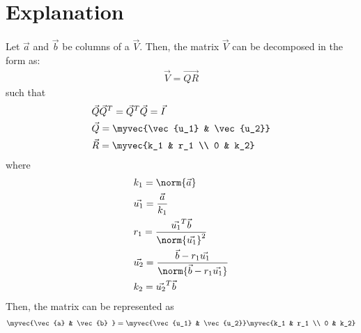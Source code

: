 \documentclass[journal,12pt,twocolumn]{IEEEtran}
\begin{document}
\section{Explanation}
Let $\vec{a}$ and $\vec{b}$ be columns of a $\vec{V}$. Then, the matrix $\vec{V}$ can be decomposed in the form as:
\begin{align}
 \vec{V} = \vec{QR}\label{eq10}
\end{align}
such that  
\begin{align}
	& \vec{Q}\vec{Q}^T= \vec{Q}^T\vec{Q} = \vec{I} \\ 
	& \vec{Q} = \myvec{\vec{u_1} & \vec{u_2}}  \\
	& \vec{R} = \myvec{k_1 & r_1 \\ 0 & k_2} 
\end{align}
where
\begin{align}
& k_1 = \norm{\vec{a}} \label{1} \\
& \vec{u_1} = \frac{\vec{a}}{k_1} \label{2} \\
& r_1 = \frac{\vec{u_1}^T\vec{b}}{\norm{\vec{u_1}}^2} \label{3} \\
& \vec{u_2} = \frac{\vec{b}-r_1\vec{u_1}}{\norm{\vec{b}-r_1\vec{u_1}}} \label{4} \\
& k_2 = \vec{u_2}^T\vec{b} \label{5}
\end{align}
Then, the matrix can be represented as 
\begin{align}
	\myvec{\vec{a} & \vec{b} } = \myvec{\vec{u_1} & \vec{u_2}}\myvec{k_1 & r_1 \\ 0 & k_2} \label{6}
\end{align}
\end{document}
